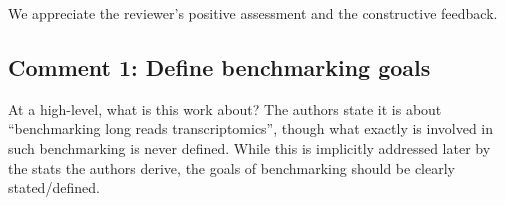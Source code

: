 \documentclass[11pt]{article}
\begin{document}
\begin{responseboxnew}
We appreciate the reviewer's positive assessment and the constructive feedback.
\end{responseboxnew}

\subsection{Comment 1: Define benchmarking goals}

\begin{reviewercomment}
    At a high-level, what is this work about? The authors state it is about ``benchmarking
    long reads transcriptomics'', though what exactly is involved in such
    benchmarking is never defined. While this is implicitly addressed later by the
    stats the authors derive, the goals of benchmarking should be clearly stated/defined.
\end{reviewercomment}
\end{document}
